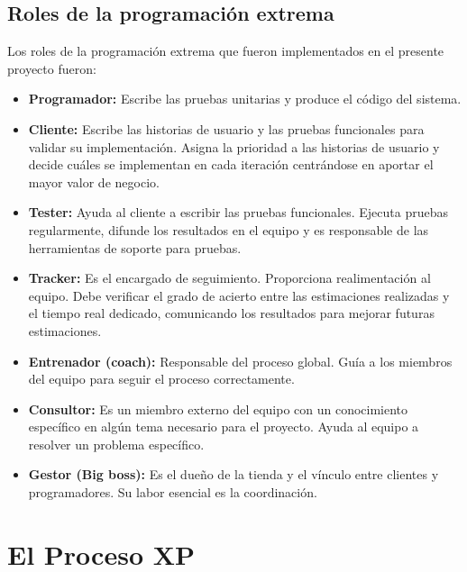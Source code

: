 

     \subsection{Roles de la programación extrema}
     \label{sub:roles_xp}

     Los roles de la programación extrema que fueron implementados en el presente proyecto fueron:

     \begin{itemize}
       \item \textbf{Programador:} Escribe las pruebas unitarias y produce el código del sistema.
       \item \textbf{Cliente:} Escribe las historias de usuario y las pruebas funcionales para validar su implementación. Asigna la prioridad a las historias de usuario y decide cuáles se implementan en cada iteración centrándose en aportar el mayor valor de negocio.
       \item \textbf{Tester:} Ayuda al cliente a escribir las pruebas funcionales. Ejecuta pruebas regularmente, difunde los resultados en el equipo y es responsable de las herramientas de soporte para pruebas.
       \item \textbf{Tracker:} Es el encargado de seguimiento. Proporciona realimentación al equipo. Debe verificar el grado de acierto entre las estimaciones realizadas y el tiempo real dedicado, comunicando los resultados para mejorar futuras estimaciones.
       \item \textbf{Entrenador (coach):} Responsable del proceso global. Guía a los miembros del equipo para seguir el proceso correctamente.
       \item \textbf{Consultor:} Es un miembro externo del equipo con un conocimiento específico en algún tema necesario para el proyecto. Ayuda al equipo a resolver un problema específico.
       \item \textbf{Gestor (Big boss):} Es el dueño de la tienda y el vínculo entre clientes y programadores. Su labor esencial es la coordinación.
     \end{itemize}



     \section{El Proceso XP} %
     \label{sec:Proceso XP}



